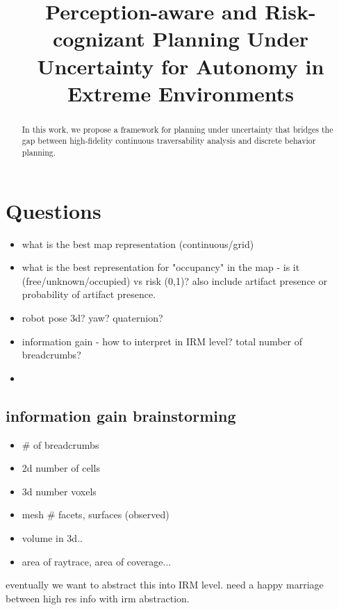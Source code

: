 \documentclass[letterpaper, 10 pt, conference]{ieeeconf}  %
\title{\LARGE \bf
Perception-aware and Risk-cognizant Planning Under Uncertainty for Autonomy in Extreme Environments
}
\newcommand{\ph}[1]{{\textbf{#1}:}} %
\begin{document}
\maketitle
\thispagestyle{empty}
\pagestyle{empty}


\begin{abstract}
In this work, we propose a framework for planning under uncertainty that bridges the gap between high-fidelity continuous traversability analysis and discrete behavior planning.
\end{abstract}



\section{Questions}
\begin{itemize}
    \item what is the best map representation (continuous/grid)
    \item what is the best representation for "occupancy" in the map - is it (free/unknown/occupied) vs risk (0,1)?  also include artifact presence or probability of artifact presence.
    \item robot pose 3d? yaw?  quaternion?
    \item information gain - how to interpret in IRM level?  total number of breadcrumbs?
    \item 
\end{itemize}

\subsection{information gain brainstorming}
\begin{itemize}
    \item \# of breadcrumbs
    \item 2d number of cells
    \item 3d number voxels
    \item mesh \# facets, surfaces (observed)
    \item volume in 3d..
    \item area of raytrace, area of coverage...
\end{itemize}
eventually we want to abstract this into IRM level.  need a happy marriage between high res info with irm abstraction.\\
\end{document}
